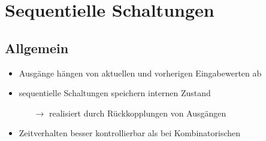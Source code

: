 \documentclass[11pt,a4paper]{article}
\begin{document}

\section{Sequentielle Schaltungen}
\subsection{Allgemein}

\begin{itemize}
\item Ausgänge hängen von aktuellen und vorherigen Eingabewerten ab
\item sequentielle Schaltungen speichern internen Zustand
	\begin{itemize}
	\item[$\rightarrow$] realisiert durch Rückkopplungen von Ausgängen
	\end{itemize}

\item Zeitverhalten besser kontrollierbar als bei Kombinatorischen
\end{itemize}
\end{document}
